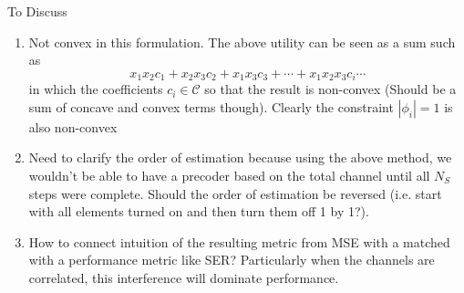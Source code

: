 \documentclass[12pt,a4paper]{report}
\begin{document}
	To Discuss
	\begin{enumerate}
	\item
		Not convex in this formulation. The above utility can be seen as a sum such as 
		\begin{equation}
		 x_1x_2 c_1 + x_2x_3c_2 + x_1x_3c_3 + \cdots + x_1x_2x_3c_i \cdots
		\end{equation}
		in which the coefficients $c_i \in \mathcal{C}$ so that the result is non-convex (Should be a sum of concave and convex terms though).
		Clearly the constraint $ | \phi_i | = 1$ is also non-convex
	\item
		Need to clarify the order of estimation because using the above method, we wouldn't be able to have a precoder based on the total channel until all $N_S$ steps were 					complete.	Should the order of estimation be reversed (i.e. start with all elements turned on and then turn them off 1 by 1?).
	\item
		How to connect intuition of the resulting metric from MSE with a matched with a performance metric like SER?
		Particularly when the channels are correlated, this interference will dominate performance.
	\end{enumerate}

\end{document}
